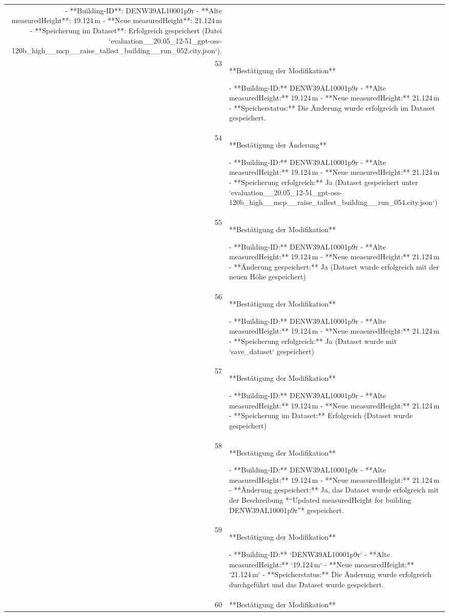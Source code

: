 \documentclass[a4paper,11pt]{article}
\begin{document}
\begin{table}[ht]
\begin{tabular}{r p{12cm}}
- **Building-ID**: DENW39AL10001p9r  
- **Alte measuredHeight**: 19.124 m  
- **Neue measuredHeight**: 21.124 m  
- **Speicherung im Dataset**: Erfolgreich gespeichert (Datei `evaluation\_\_20.05\_12-51\_gpt-oss-120b\_high\_\_mcp\_\_raise\_tallest\_building\_\_run\_052.city.json`). \\
53 & **Bestätigung der Modifikation**

- **Building-ID:** DENW39AL10001p9r  
- **Alte measuredHeight:** 19.124 m  
- **Neue measuredHeight:** 21.124 m  
- **Speicherstatus:** Die Änderung wurde erfolgreich im Dataset gespeichert. \\
54 & **Bestätigung der Änderung**

- **Building-ID:** DENW39AL10001p9r  
- **Alte measuredHeight:** 19.124 m  
- **Neue measuredHeight:** 21.124 m  
- **Speicherung erfolgreich:** Ja (Dataset gespeichert unter `evaluation\_\_20.05\_12-51\_gpt-oss-120b\_high\_\_mcp\_\_raise\_tallest\_building\_\_run\_054.city.json`) \\
55 & **Bestätigung der Modifikation**

- **Building-ID:** DENW39AL10001p9r  
- **Alte measuredHeight:** 19.124 m  
- **Neue measuredHeight:** 21.124 m  
- **Änderung gespeichert:** Ja (Dataset wurde erfolgreich mit der neuen Höhe gespeichert) \\
56 & **Bestätigung der Modifikation**

- **Building-ID:** DENW39AL10001p9r  
- **Alte measuredHeight:** 19.124 m  
- **Neue measuredHeight:** 21.124 m  
- **Speicherung erfolgreich:** Ja (Dataset wurde mit `save\_dataset` gespeichert) \\
57 & **Bestätigung der Modifikation**

- **Building-ID:** DENW39AL10001p9r  
- **Alte measuredHeight:** 19.124 m  
- **Neue measuredHeight:** 21.124 m  
- **Speicherung im Dataset:** Erfolgreich (Dataset wurde gespeichert) \\
58 & **Bestätigung der Modifikation**

- **Building-ID:** DENW39AL10001p9r  
- **Alte measuredHeight:** 19.124 m  
- **Neue measuredHeight:** 21.124 m  
- **Änderung gespeichert:** Ja, das Dataset wurde erfolgreich mit der Beschreibung *“Updated measuredHeight for building DENW39AL10001p9r”* gespeichert. \\
59 & **Bestätigung der Modifikation**

- **Building-ID:** `DENW39AL10001p9r`  
- **Alte measuredHeight:** `19.124 m`  
- **Neue measuredHeight:** `21.124 m`  
- **Speicherstatus:** Die Änderung wurde erfolgreich durchgeführt und das Dataset wurde gespeichert. \\
60 & **Bestätigung der Modifikation**


\end{tabular}
\end{table}
\end{document}
